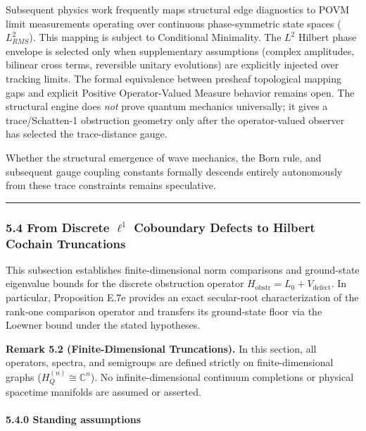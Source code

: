 \documentclass[
]{article}
\renewenvironment{quote}
  {\begin{leftbar}\small}
  {\end{leftbar}}
\begin{document}
Subsequent physics work frequently maps structural edge diagnostics to POVM limit measurements operating over continuous phase-symmetric state spaces (\(L^2_{RMS}\)). This mapping is subject to Conditional Minimality. The \(L^2\) Hilbert phase envelope is selected only when supplementary assumptions (complex amplitudes, bilinear cross terms, reversible unitary evolutions) are explicitly injected over tracking limits. The formal equivalence between presheaf topological mapping gaps and explicit Positive Operator-Valued Measure behavior remains open. The structural engine does \emph{not} prove quantum mechanics universally; it gives a trace/Schatten-1 obstruction geometry only after the operator-valued observer has selected the trace-distance gauge.

Whether the structural emergence of wave mechanics, the Born rule, and subsequent gauge coupling constants formally descends entirely autonomously from these trace constraints remains speculative.

\begin{center}\rule{0.5\linewidth}{0.5pt}\end{center}

\subsubsection{\texorpdfstring{5.4 From Discrete \(\ell^1\) Coboundary Defects to Hilbert Cochain Truncations}{5.4 From Discrete \textbackslash ell\^{}1 Coboundary Defects to Hilbert Cochain Truncations}}\label{from-discrete-ell1-coboundary-defects-to-hilbert-cochain-truncations}

This subsection establishes finite-dimensional norm comparisons and ground-state eigenvalue bounds for the discrete obstruction operator \(H_{\mathrm{obstr}} = L_0 + V_{\mathrm{defect}}\). In particular, Proposition E.7e provides an exact secular-root characterization of the rank-one comparison operator and transfers its ground-state floor via the Loewner bound under the stated hypotheses.

\begin{quote}
\textbf{Remark 5.2 (Finite-Dimensional Truncations).} In this section, all operators, spectra, and semigroups are defined strictly on finite-dimensional graphs (\(H_Q^{(n)} \cong \mathbb{C}^n\)). No infinite-dimensional continuum completions or physical spacetime manifolds are assumed or asserted.
\end{quote}

\paragraph{5.4.0 Standing assumptions}\label{standing-assumptions}
\end{document}
